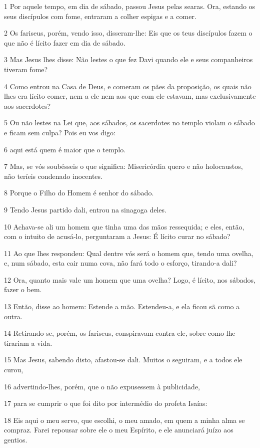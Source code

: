\par 1 Por aquele tempo, em dia de sábado, passou Jesus pelas searas. Ora, estando os seus discípulos com fome, entraram a colher espigas e a comer.
\par 2 Os fariseus, porém, vendo isso, disseram-lhe: Eis que os teus discípulos fazem o que não é lícito fazer em dia de sábado.
\par 3 Mas Jesus lhes disse: Não lestes o que fez Davi quando ele e seus companheiros tiveram fome?
\par 4 Como entrou na Casa de Deus, e comeram os pães da proposição, os quais não lhes era lícito comer, nem a ele nem aos que com ele estavam, mas exclusivamente aos sacerdotes?
\par 5 Ou não lestes na Lei que, aos sábados, os sacerdotes no templo violam o sábado e ficam sem culpa? Pois eu vos digo:
\par 6 aqui está quem é maior que o templo.
\par 7 Mas, se vós soubésseis o que significa: Misericórdia quero e não holocaustos, não teríeis condenado inocentes.
\par 8 Porque o Filho do Homem é senhor do sábado.
\par 9 Tendo Jesus partido dali, entrou na sinagoga deles.
\par 10 Achava-se ali um homem que tinha uma das mãos ressequida; e eles, então, com o intuito de acusá-lo, perguntaram a Jesus: É lícito curar no sábado?
\par 11 Ao que lhes respondeu: Qual dentre vós será o homem que, tendo uma ovelha, e, num sábado, esta cair numa cova, não fará todo o esforço, tirando-a dali?
\par 12 Ora, quanto mais vale um homem que uma ovelha? Logo, é lícito, nos sábados, fazer o bem.
\par 13 Então, disse ao homem: Estende a mão. Estendeu-a, e ela ficou sã como a outra.
\par 14 Retirando-se, porém, os fariseus, conspiravam contra ele, sobre como lhe tirariam a vida.
\par 15 Mas Jesus, sabendo disto, afastou-se dali. Muitos o seguiram, e a todos ele curou,
\par 16 advertindo-lhes, porém, que o não expusessem à publicidade,
\par 17 para se cumprir o que foi dito por intermédio do profeta Isaías:
\par 18 Eis aqui o meu servo, que escolhi, o meu amado, em quem a minha alma se compraz. Farei repousar sobre ele o meu Espírito, e ele anunciará juízo aos gentios.
